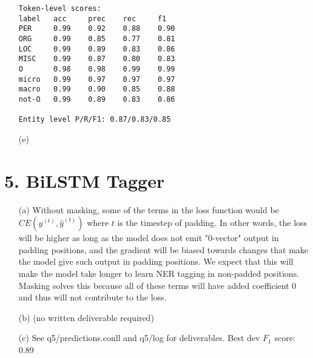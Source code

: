 \documentclass{article}
\begin{document}
\begin{itemize}
\begin{verbatim}
Token-level scores:
label	acc  	prec 	rec  	f1   
PER  	0.99 	0.92 	0.88 	0.90 
ORG  	0.99 	0.85 	0.77 	0.81 
LOC  	0.99 	0.89 	0.83 	0.86 
MISC 	0.99 	0.87 	0.80 	0.83 
O    	0.98 	0.98 	0.99 	0.99 
micro	0.99 	0.97 	0.97 	0.97 
macro	0.99 	0.90 	0.85 	0.88 
not-O	0.99 	0.89 	0.83 	0.86 

Entity level P/R/F1: 0.87/0.83/0.85

    \end{verbatim}

    \item[(e)] 
\end{itemize}

\section*{5. BiLSTM Tagger}

\begin{itemize}
    \item[(a)] Without masking, some of the terms in the loss function would be $CE(y^{(t)}, \hat{y}^{(t)})$ where $t$ is the timestep of padding. In other words, the loss will be higher as long as the model does not emit "0-vector" output in padding positions, and the gradient will be biased towards changes that make the model give such output in padding positions. We expect that this will make the model take longer to learn NER tagging in non-padded positions. Masking solves this because all of these terms will have added coefficient $0$ and thus will not contribute to the loss.
    \item[(b)] (no written deliverable required)
    \item[(c)] See q5/predictions.conll and q5/log for deliverables. Best dev $F_1$ score: 0.89
\end{itemize}
\end{document}
